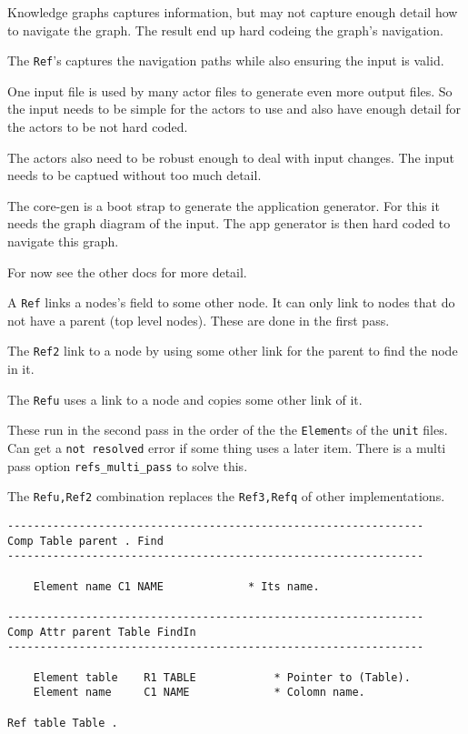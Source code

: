 Knowledge graphs captures information, but may not capture enough detail
how to navigate the graph. The result end up hard codeing the graph's
navigation.

The \texttt{Ref}'s captures the navigation paths while also ensuring the
input is valid.

One input file is used by many actor files to generate even more output
files. So the input needs to be simple for the actors to use and also
have enough detail for the actors to be not hard coded.

The actors also need to be robust enough to deal with input changes. The
input needs to be captued without too much detail.

The core-gen is a boot strap to generate the application generator. For
this it needs the graph diagram of the input. The app generator is then
hard coded to navigate this graph.

For now see the other docs for more detail.

A \texttt{Ref} links a nodes's field to some other node. It can only
link to nodes that do not have a parent (top level nodes). These are
done in the first pass.

The \texttt{Ref2} link to a node by using some other link for the parent
to find the node in it.

The \texttt{Refu} uses a link to a node and copies some other link of
it.

These run in the second pass in the order of the the \texttt{Element}s
of the \texttt{unit} files. Can get a \texttt{not\ resolved} error if
some thing uses a later item. There is a multi pass option
\texttt{refs\_multi\_pass} to solve this.

The \texttt{Refu,Ref2} combination replaces the \texttt{Ref3,Refq} of
other implementations.

\begin{verbatim}
----------------------------------------------------------------
Comp Table parent . Find
----------------------------------------------------------------

    Element name C1 NAME             * Its name.

----------------------------------------------------------------
Comp Attr parent Table FindIn
----------------------------------------------------------------

    Element table    R1 TABLE            * Pointer to (Table).
    Element name     C1 NAME             * Colomn name.

Ref table Table .
\end{verbatim}

